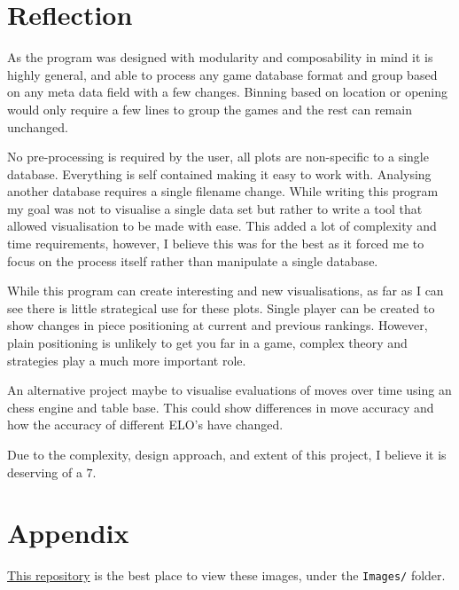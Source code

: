 \documentclass[11pt]{article}
\begin{document}
\section{Reflection}
\label{sec:org28a6f1a}
As the program was designed with modularity and composability in mind it is highly general, and able to process any game database format and group based on any meta data field with a few changes. Binning based on location or opening would only require a few lines to group the games and the rest can remain unchanged.

No pre-processing is required by the user, all plots are non-specific to a single database. Everything is self contained making it easy to work with. Analysing another database requires a single filename change.
While writing this program my goal was not to visualise a single data set but rather to write a tool that allowed visualisation to be made with ease. This added a lot of complexity and time requirements, however, I believe this was for the best as it forced me to focus on the process itself rather than manipulate a single database.

While this program can create interesting and new visualisations, as far as I can see there is little strategical use for these plots. Single player can be created to show changes in piece positioning at current and previous rankings. However, plain positioning is unlikely to get you far in a game, complex theory and strategies play a much more important role.

An alternative project maybe to visualise evaluations of moves over time using an chess engine and table base. This could show differences in move accuracy and how the accuracy of different ELO's have changed.

Due to the complexity, design approach, and extent of this project, I believe it is deserving of a \(7\).
\newpage


\newpage
\section{Appendix}
\label{sec:orgdcc6828}
\href{https://github.com/Jake-Moss/chess-analysis/tree/master/Images}{This repository} is the best place to view these images, under the \texttt{Images/} folder.
\end{document}

